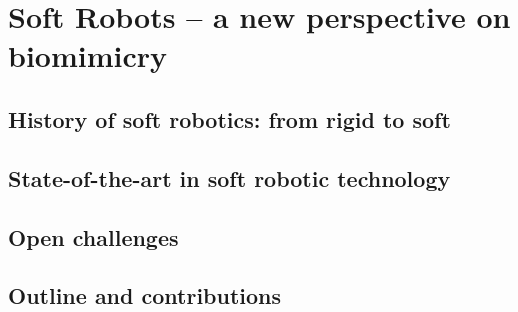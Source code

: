 \chapter[Soft Robots -- a new perspective]{Soft Robots -- a new perspective on biomimicry}
\label{chap: chapter 0}
\vspace*{-5mm}

\ifx\printIntroduction\undefined
\else

\section{History of soft robotics: from rigid to soft} \label{sec: chap1 0_history}


\section{State-of-the-art in soft robotic technology} \label{sec: chap1 0_SOT}


\section{Open challenges}


\section{Outline and contributions}
%
%
%
%


\fi


